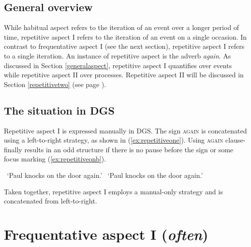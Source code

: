 \subsection{General overview}

While habitual aspect refers to the iteration of an event over a longer period of time, repetitive aspect I refers to the iteration of an event on a single occasion. In contrast to frequentative aspect I (see the next section), repetitive aspect I refers to a single iteration. An instance of repetitive aspect is the adverb \textit{again}. As discussed in Section \ref{generalaspect}, repetitive aspect I quantifies over events while repetitive aspect II over processes. Repetitive aspect II will be discussed in Section \ref{repetitivetwo} (see page \pageref{repetitivetwo}). 

\subsection{The situation in DGS}
Repetitive aspect I is expressed manually in DGS. The sign \textsc{again} is concatenated using a left-to-right strategy, as shown in (\ref{ex:repetitiveone}). Using \textsc{again} clause-finally results in an odd structure if there is no pause before the sign or some focus marking (\ref{ex:repetitiveonb}).

\begin{exe}
\ex\begin{xlist} 
\glt \textcolor{white}{?}`Paul knocks on the door again.' \label{ex:repetitiveone}
\glt \textcolor{white}{?}`Paul knocks on the door again.' \label{ex:repetitiveonb}
\end{xlist}
\end{exe}  

\noindent Taken together, repetitive aspect I employs a manual-only strategy and is concatenated from left-to-right. 


\section{Frequentative aspect I (\textit{often})}\label{frequentative}
